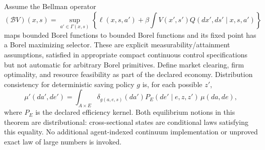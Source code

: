 \documentclass[11pt,a4paper]{article}
\theoremstyle{definition}
\begin{document}
Assume the Bellman operator
\[
 (\mathcal BV)(x,s)=\sup_{a'\in\Gamma(x,s)}
 \left\{\ell(x,s,a')+\beta\int V(x',s')Q(dx',ds'\mid x,s,a')\right\}
\]
maps bounded Borel functions to bounded Borel functions and its fixed point has a Borel maximizing selector. These are explicit measurability/attainment assumptions, satisfied in appropriate compact continuous control specifications but not automatic for arbitrary Borel primitives. Define market clearing, firm optimality, and resource feasibility as part of the declared economy. Distribution consistency for deterministic saving policy $g$ is, for each possible $z'$,
\[
 \mu'(da',de')=\int_{A\times E}\delta_{g(a,e,s)}(da')
        P_E(de'\mid e,z,z')\,\mu(da,de),
\]
where $P_E$ is the declared efficiency kernel. Both equilibrium notions in this theorem are distributional: cross-sectional states are conditional laws satisfying this equality. No additional agent-indexed continuum implementation or unproved exact law of large numbers is invoked.
\end{document}
